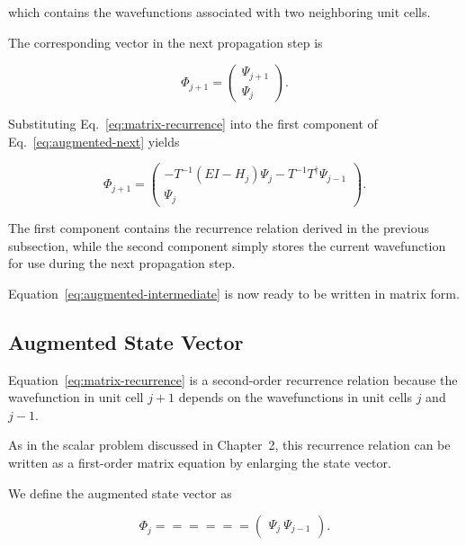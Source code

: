 which contains the wavefunctions associated with two neighboring unit
cells.

The corresponding vector in the next propagation step is

\begin{equation}
	\Phi_{j+1}
	=
	\begin{pmatrix}
		\Psi_{j+1} \\
		\Psi_j
	\end{pmatrix}.
	\label{eq:augmented-next}
\end{equation}

Substituting Eq.~\eqref{eq:matrix-recurrence} into the first component of
Eq.~\eqref{eq:augmented-next} yields

\begin{equation}
	\Phi_{j+1}
	=
	\begin{pmatrix}
		-T^{-1}(EI-H_j)\Psi_j
		-
		T^{-1}T^\dagger\Psi_{j-1}
		\\[1ex]
		\Psi_j
	\end{pmatrix}.
	\label{eq:augmented-intermediate}
\end{equation}

The first component contains the recurrence relation derived in the
previous subsection, while the second component simply stores the current
wavefunction for use during the next propagation step.

Equation~\eqref{eq:augmented-intermediate} is now ready to be written in
matrix form.



\subsection{Augmented State Vector}

Equation~\eqref{eq:matrix-recurrence} is a second-order recurrence
relation because the wavefunction in unit cell $j+1$ depends on the
wavefunctions in unit cells $j$ and $j-1$.

As in the scalar problem discussed in Chapter~2, this recurrence relation
can be written as a first-order matrix equation by enlarging the state
vector.

We define the augmented state vector as

\begin{equation}
	\Phi_j
	======

	\begin{pmatrix}
		\Psi_j \
		\Psi_{j-1}
	\end{pmatrix}.
	\label{eq:augmented-state-vector}
\end{equation}

